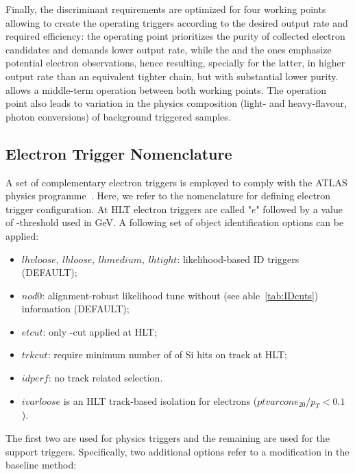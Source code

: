 Finally, the discriminant requirements are optimized for four working points
allowing to create the operating triggers according to the desired output rate
and required efficiency: the \tight{} operating point prioritizes the purity of
collected electron candidates and demands lower output rate, while the \loose{}
and the \vloose{} ones emphasize potential electron observations, hence
resulting, specially for the latter, in higher output rate than an equivalent
tighter chain, but with substantial lower purity. \medium{} allows a middle-term
operation between both working points. The operation point also leads to
variation in the physics composition (light- and heavy-flavour, photon
conversions) of background triggered samples.




\subsection{Electron Trigger Nomenclature}%
\label{ssec:menu}

A set of complementary electron triggers is employed to comply with the ATLAS
physics programme~\cite{aad2020performance}. Here, we refer to the nomenclature for
defining electron trigger configuration.  At HLT electron triggers are called
"$e$" followed by a value of \et-threshold used in GeV. A following set of
object identification options can be applied:



\begin{itemize}
\item $lhvloose,~lhloose,~lhmedium,~lhtight$: likelihood-based ID triggers (DEFAULT);
\item $nod0$: alignment-robust likelihood tune without \trackdO (see able~\ref{tab:IDcuts}) information (DEFAULT);
\item $etcut$: only \et-cut applied at HLT;
\item $trkcut$: require minimum number of of Si hits on track at HLT;
\item $idperf$: no track related selection.
\item $ivarloose$ is an HLT track-based isolation for electrons ($ptvarcone_{20}/p_T<0.1$).
\end{itemize}




The first two are used for physics triggers and the remaining are used
for the support triggers. Specifically, two additional options refer to
a modification in the \fastcalo{} baseline method:

